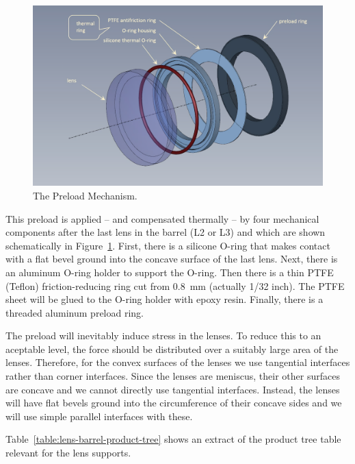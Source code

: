 \documentclass{article}
\begin{document}
\begin{figure}
\begin{center}
\includegraphics[width=0.7\linewidth]{figures/rosalia-rings.png}
\end{center}
\caption{The Preload Mechanism.}
\label{figure:rosalia-rings}
\end{figure}

This preload is applied -- and compensated thermally -- by four mechanical components after the last lens in the barrel (L2 or L3) and which are shown schematically in Figure~\ref{figure:rosalia-rings}. First, there is a silicone O-ring that makes contact with a flat bevel ground into the concave surface of the last lens. Next, there is an aluminum O-ring holder to support the O-ring. Then there is a thin PTFE (Teflon) friction-reducing ring cut from 0.8~mm (actually 1/32 inch). The PTFE sheet will be glued to the O-ring holder with epoxy resin. Finally, there is a threaded aluminum preload ring.

The preload will inevitably induce stress in the lenses. To reduce this to an aceptable level, the force should be distributed over a suitably large area of the lenses. Therefore, for the convex surfaces of the lenses we use tangential interfaces rather than corner interfaces. Since the lenses are meniscus, their other surfaces are concave and we cannot directly use tangential interfaces. Instead, the lenses will have flat bevels ground into the circumference of their concave sides and we will use simple parallel interfaces with these.

Table~\ref{table:lens-barrel-product-tree} shows an extract of the product tree table relevant for the lens supports.
\end{document}
